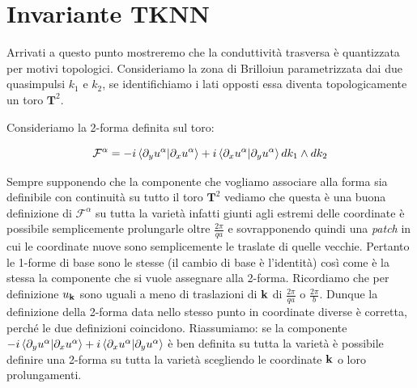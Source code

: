 \documentclass[12pt,a4paper]{article}
\begin{document}
\section{Invariante TKNN}
Arrivati a questo punto mostreremo che la conduttività trasversa è quantizzata per motivi topologici. Consideriamo la zona di Brilloiun parametrizzata dai due quasimpulsi $k_1$ e $k_2$, se identifichiamo i lati opposti essa diventa topologicamente un toro $\mathbf{T}^2$. 

Consideriamo la 2-forma definita sul toro:

\[\mathcal{F}^{\alpha} = -i \braket{\partial_y u^{\alpha} | \partial_x u^{\alpha}} +i \braket{\partial_x u^{\alpha} | \partial_y u^{\alpha}} dk_1 \wedge dk_2 \]


Sempre supponendo che la componente che vogliamo associare alla forma sia definibile con continuità su tutto il toro $\mathbf{T}^2$ vediamo che questa è una buona definizione di $\mathcal{F}^{\alpha}$ su tutta la varietà infatti giunti agli estremi delle coordinate è possibile semplicemente prolungarle oltre $\frac{2 \pi}{qa}$ e sovrapponendo quindi una \emph{patch} in cui le coordinate nuove sono semplicemente le traslate di quelle vecchie. Pertanto le 1-forme di base sono le stesse (il cambio di base è l'identità) così come è la stessa la componente che si vuole assegnare alla 2-forma. Ricordiamo che per definizione $u_{\bold{k}}$ sono uguali a meno di traslazioni di $\bold{k}$ di $\frac{2 \pi}{qa}$ o $\frac{2 \pi}{b}$. Dunque la definizione della 2-forma data nello stesso punto in coordinate diverse è corretta, perché le due definizioni coincidono. Riassumiamo: se la componente $-i \braket{\partial_y u^{\alpha} | \partial_x u^{\alpha}} +i \braket{\partial_x u^{\alpha} | \partial_y u^{\alpha}}$ è ben definita su tutta la varietà è possibile definire una 2-forma su tutta la varietà scegliendo le coordinate $\bold{k}$ o loro prolungamenti.\newline

\end{document}
